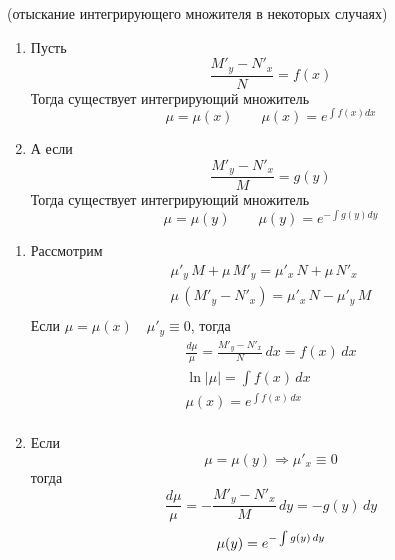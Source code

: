 \begin{Note}(отыскание интегрирующего множителя в некоторых случаях)\\
    \begin{enumerate}
    	\item 
    Пусть 
    \[
        \frac{M'_y-N'_x}{N}=f(x)
    \]
    Тогда существует интегрирующий множитель
    \[
        \mu=\mu(x) \qquad \mu(x)=e^{\int f(x)dx}
    \]
    \item А если  
    \[
	    \frac{M'_y-N'_x}{M}=g(y)
    \]
    Тогда существует интегрирующий множитель
    \[
    \mu=\mu(y) \qquad \mu(y)=e^{-\int g(y)dy}
    \]
    \end{enumerate}
\end{Note}  

\begin{Proof}
    \begin{enumerate}
    	\item Рассмотрим
    	\begin{gather*}
    	    \mu'_y\,M+\mu\,M'_y=\mu'_x\,N+\mu\,N'_x\\
    	    \mu\,(M'_y-N'_x)=\mu'_x\,N-\mu'_y\,M\\
    	\end{gather*}
    	Если $\mu = \mu(x) \quad \mu'_y \equiv 0$, тогда
    	\begin{gather*}
    	    \frac{d\mu}{\mu}=\frac{M'_y-N'_x}{N}\,dx=f(x)\,dx\\
    	    \ln|\mu|=\int f(x)\,dx\\
    	    \mu(x)=e^{\int f(x)\,dx}\\
    	\end{gather*}
    	\item Если
    	\[
    	\mu = \mu(y) \Rightarrow \mu'_x \equiv 0\]
    	тогда 
    	\[
    	\frac{d\mu}{\mu} = -\frac{M'_y-N'_x}{M}\,dy=-g(y)\,dy\]
    	\[
    	\mu(y)=e^{-\int g(y)\,dy}\\
    	\]
    \end{enumerate}
\end{Proof}


